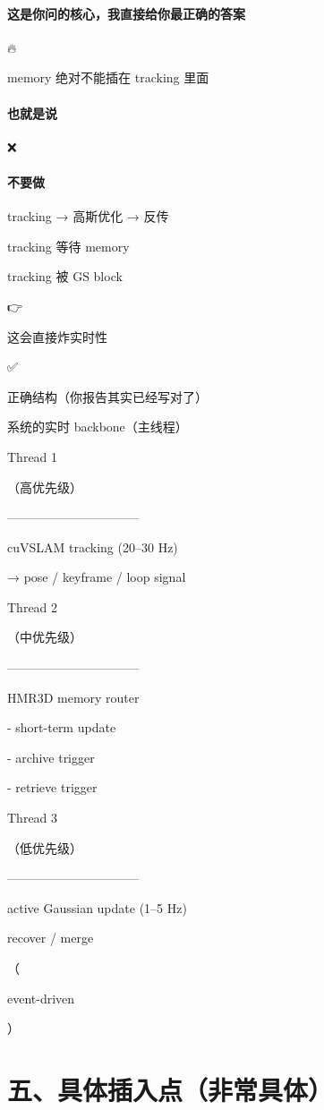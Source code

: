 \documentclass[12pt]{article}
\begin{document}
\paragraph{这是你问的核心，我直接给你最正确的答案}
🔥

memory 绝对不能插在 tracking 里面

\paragraph{也就是说}
❌

\paragraph{不要做}
tracking → 高斯优化 → 反传

tracking 等待 memory

tracking 被 GS block

👉

这会直接炸实时性

✅

正确结构（你报告其实已经写对了）

系统的实时 backbone（主线程）

Thread 1

（⾼优先级）

--------------------------------

cuVSLAM tracking (20–30 Hz)

→ pose / keyframe / loop signal

Thread 2

（中优先级）

--------------------------------

HMR3D memory router

- short-term update

- archive trigger

- retrieve trigger

Thread 3

（低优先级）

--------------------------------

active Gaussian update (1–5 Hz)

recover / merge

（

event-driven

）

\section{五、具体插入点（非常具体）}
\end{document}
